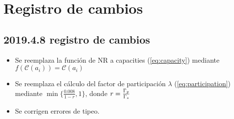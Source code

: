 \section{Registro de cambios}
\subsection{2019.4.8 registro de cambios}
\begin{itemize}
	\item Se reemplaza la función de NR a capacities (\ref{eq:capacity}) mediante $f(\mathcal{C}(a_i))=\mathcal{C}(a_i)$
	\item Se reemplaza el cálculo del factor de participación $\lambda$ (\ref{eq:participation}) mediante $\min\{\frac{0.008}{1-r},1\}$, donde $r=\frac{\Gamma_p}{\Gamma_s}$
	\item Se corrigen errores de tipeo.
\end{itemize}